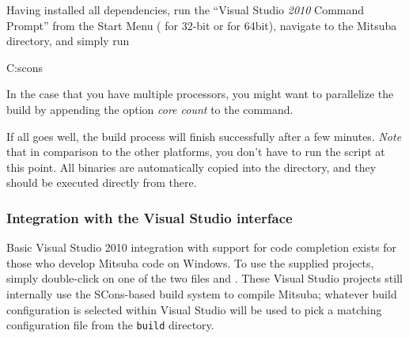 Having installed all dependencies, run the ``Visual Studio \emph{2010} Command 
Prompt'' from the Start Menu ( for 32-bit or  for 64bit), 
navigate to the Mitsuba directory, and simply run
\begin{shell}
C:\mitsuba\>scons
\end{shell}
In the case that you have multiple processors, you might want to parallelize the build by appending the option \emph{core count} to the  command.

If all goes well, the build process will finish successfully after a few
minutes. \emph{Note} that in comparison to the other platforms, you don't have to run the  script at this point. 
All binaries are automatically copied into the  directory, and they should be executed directly from there.

\subsubsection{Integration with the Visual Studio interface}
Basic Visual Studio 2010 integration with support for code completion 
exists for those who develop Mitsuba code on Windows. 
To use the supplied projects, simply double-click on one of the two files  
and . These Visual Studio projects still internally
use the SCons-based build system to compile Mitsuba; whatever 
build configuration is selected within Visual Studio will be used to pick a matching
configuration file from the \texttt{build} directory. 

